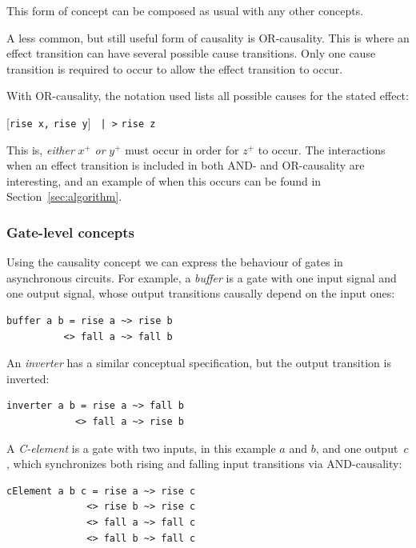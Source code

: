 \documentclass[british,conference,compsoc]{IEEEtran}
\begin{document}
This form of concept can be composed as usual with any other concepts.

A less common, but still useful form of causality is OR-causality. This is 
where an effect transition can have several possible cause transitions. Only 
one cause transition is required to occur to allow the effect transition to 
occur. 

With OR-causality, the notation used lists all possible causes for the stated 
effect:

\begin{center}
      [\texttt{rise x,} \texttt{rise y}] \texttt{~|~>} \texttt{rise z}
\end{center}

This is, \emph{either} $x^{+}$ \emph{or} $y^{+}$ must occur in order for 
$z^{+}$ to occur. The interactions when an effect transition is included in both AND- and 
OR-causality are interesting, and an example of when this occurs can be found 
in Section~\ref{sec:algorithm}.

\vspace{-2mm}

\subsubsection{Gate-level concepts \label{subsub:gate-level}} Using the causality concept we can express
the behaviour of gates in asynchronous circuits. For example, a \emph{buffer}
is a gate with one input signal and one output signal,
whose output transitions causally depend on the input ones:

\begin{verbatim}
buffer a b = rise a ~> rise b 
          <> fall a ~> fall b
\end{verbatim}

\noindent An \emph{inverter} has a similar conceptual specification, but the
output transition is inverted:

\begin{verbatim}
inverter a b = rise a ~> fall b
            <> fall a ~> rise b
\end{verbatim}

\noindent A \emph{C-element} is a gate with two inputs, in this example $a$ and $b$, and one
output~$c$, which synchronizes both rising and falling input transitions
via AND-causality:

\begin{verbatim}
cElement a b c = rise a ~> rise c 
              <> rise b ~> rise c
              <> fall a ~> fall c 
              <> fall b ~> fall c
\end{verbatim}
\end{document}
